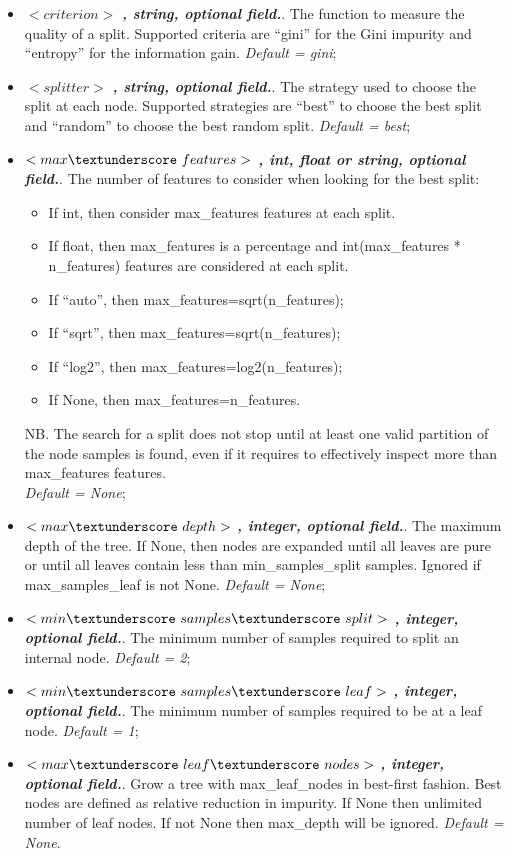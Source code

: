 \begin{itemize}
\item $<criterion>$ \textbf{\textit{, string, optional field.}}.  The function to measure the quality of a split. Supported criteria are ``gini'' for the Gini impurity and ``entropy'' for the information gain. \textit{Default = gini};
\item $<splitter>$ \textbf{\textit{, string, optional field.}}. The strategy used to choose the split at each node. Supported strategies are ``best'' to choose the best split and ``random'' to choose the best random split. \textit{Default = best};
\item $<max\textunderscore~features>$ \textbf{\textit{, int, float or string, optional field.}}. The number of features to consider when looking for the best split:
\begin{itemize}
\item If int, then consider max\_features features at each split.
\item If float, then max\_features  is a percentage and int(max\_features * n\_features) features are considered at each split.
\item If “auto”, then max\_features=sqrt(n\_features);
\item If “sqrt”, then max\_features=sqrt(n\_features);
\item If “log2”, then max\_features=log2(n\_features);
\item If None, then max\_features=n\_features.
\end{itemize}
NB. The search for a split does not stop until at least one valid partition of the node samples is found, even if it requires to effectively inspect more than max\_features features. 
\\\textit{Default = None};
\item $<max\textunderscore~depth>$ \textbf{\textit{, integer, optional field.}}. The maximum depth of the tree. If None, then nodes are expanded until all leaves are pure or until all leaves contain less than min\_samples\_split samples. Ignored if max\_samples\_leaf is not None. \textit{Default = None};
\item $<min\textunderscore~samples\textunderscore~split>$ \textbf{\textit{, integer, optional field.}}. The minimum number of samples required to split an internal node. \textit{Default = 2};
\item $<min\textunderscore~samples\textunderscore~leaf>$ \textbf{\textit{, integer, optional field.}}. The minimum number of samples required to be at a leaf node. \textit{Default = 1};
\item $<max\textunderscore~leaf\textunderscore~nodes>$ \textbf{\textit{, integer, optional field.}}. Grow a tree with max\_leaf\_nodes in best-first fashion. Best nodes are defined as relative reduction in impurity. If None then unlimited number of leaf nodes. If not None then max\_depth will be ignored. \textit{Default = None}.
\end{itemize}
